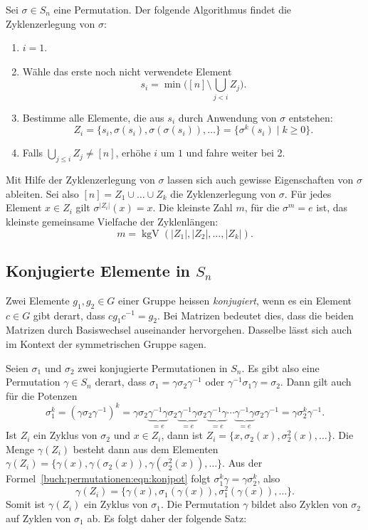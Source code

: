 \begin{satz}
Sei $\sigma\in S_n$ eine Permutation. Der folgende Algorithmus findet
die Zyklenzerlegung von $\sigma$:
\begin{enumerate}
\item
$i=1$.
\item
Wähle das erste noch nicht verwendete Element
\[
s_i=\min\biggl( [n] \setminus \bigcup_{j< i} Z_j\biggr).
\]
\item
Bestimme alle Elemente, die aus $s_i$ durch Anwendung von $\sigma$
entstehen:
\[
Z_i
=
\{ s_i, \sigma(s_i), \sigma(\sigma(s_i)), \dots \}
=
\{\sigma^k(s_i) \mid k\ge 0\}.
\]
\item
Falls $\bigcup_{j\le i} Z_j\ne [n]$, erhöhe $i$ um $1$ und fahre 
weiter bei 2.
\end{enumerate}
\end{satz}

Mit Hilfe der Zyklenzerlegung von $\sigma$ lassen sich auch
gewisse Eigenschaften von $\sigma$ ableiten.
Sei also $[n] = Z_1\cup\dots\cup Z_k$ die Zyklenzerlegung von $\sigma$.
Für jedes Element $x\in Z_i$ gilt $\sigma^{|Z_i|}(x) = x$.
Die kleinste Zahl $m$, für die $\sigma^m=e$ ist, das kleinste
gemeinsame Vielfache der Zyklenlängen:
\[
m = \operatorname{kgV} (|Z_1|,|Z_2|,\dots,|Z_k|).
\]

\subsection{Konjugierte Elemente in $S_n$}
Zwei Elemente $g_1,g_2\in G$ einer Gruppe heissen {\em konjugiert}, wenn
es ein Element $c\in G$ gibt derart, dass $cg_1c^{-1}=g_2$.
Bei Matrizen bedeutet dies, dass die beiden Matrizen durch
Basiswechsel auseinander hervorgehen.
Dasselbe lässt sich auch im Kontext der symmetrischen Gruppe sagen.

Seien $\sigma_1$ und $\sigma_2$ zwei konjugierte Permutationen in $S_n$.
Es gibt also eine Permutation $\gamma\in S_n$ derart, dass
$\sigma_1=\gamma\sigma_2\gamma^{-1}$ oder $\gamma^{-1}\sigma_1\gamma=\sigma_2$.
Dann gilt auch für die Potenzen
\begin{equation}
\sigma_1^k
=
(\gamma\sigma_2\gamma^{-1})^k
=
\gamma\sigma_2\underbrace{\gamma^{-1}
\gamma}_{\displaystyle=e}\sigma_2\underbrace{\gamma^{-1}
\gamma}_{\displaystyle=e}\sigma_2\underbrace{\gamma^{-1}\gamma}_{\displaystyle=e}
\cdots
\underbrace{\gamma^{-1}
\gamma}_{\displaystyle=e}\sigma_2\gamma^{-1}
=
\gamma\sigma_2^k\gamma^{-1}.
\label{buch:permutationen:eqn:konjpot}
\end{equation}
Ist $Z_i$ ein Zyklus von $\sigma_2$ und $x\in Z_i$, dann ist
$Z_i = \{ x,\sigma_2(x),\sigma_2^2(x),\dots\}$.
Die Menge $\gamma(Z_i)$ besteht dann aus dem Elementen
$\gamma(Z_i)=\{\gamma(x),\gamma(\sigma_2(x)),\gamma(\sigma_2^2(x)),\dots\}$.
Aus der Formel~\eqref{buch:permutationen:eqn:konjpot} folgt
$\sigma_1^k\gamma = \gamma\sigma_2^k$, also
\[
\gamma(Z_i)
=
\{\gamma(x),\sigma_1(\gamma(x)),\sigma_1^2(\gamma(x)),\dots\}.
\]
Somit ist $\gamma(Z_i)$ ein Zyklus von $\sigma_1$.
Die Permutation $\gamma$ bildet also Zyklen von $\sigma_2$ auf Zyklen
von $\sigma_1$ ab.
Es folgt daher der folgende Satz:

